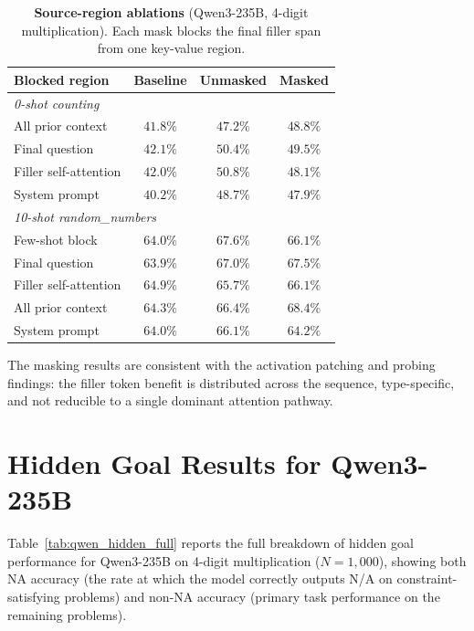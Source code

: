 \documentclass{article}
\begin{document}
\begin{table}[h]
\centering
\caption{\textbf{Source-region ablations} (Qwen3-235B, 4-digit multiplication). Each mask blocks the final filler span from one key-value region.}
\label{tab:mask_source}
\small
{}
\begin{tabular}{@{}lccc@{}}
\toprule
\textbf{Blocked region} & \textbf{Baseline} & \textbf{Unmasked} & \textbf{Masked} \\
\midrule
\multicolumn{4}{l}{\textit{0-shot counting}} \\
All prior context      & $41.8\%$ & $47.2\%$ & $48.8\%$ \\
Final question         & $42.1\%$ & $50.4\%$ & $49.5\%$ \\
Filler self-attention  & $42.0\%$ & $50.8\%$ & $48.1\%$ \\
System prompt          & $40.2\%$ & $48.7\%$ & $47.9\%$ \\
\midrule
\multicolumn{4}{l}{\textit{10-shot random\_numbers}} \\
Few-shot block         & $64.0\%$ & $67.6\%$ & $66.1\%$ \\
Final question         & $63.9\%$ & $67.0\%$ & $67.5\%$ \\
Filler self-attention  & $64.9\%$ & $65.7\%$ & $66.1\%$ \\
All prior context      & $64.3\%$ & $66.4\%$ & $68.4\%$ \\
System prompt          & $64.0\%$ & $66.1\%$ & $64.2\%$ \\
\bottomrule
\end{tabular}
\end{table}

The masking results are consistent with the activation patching and probing findings: the filler token benefit is distributed across the sequence, type-specific, and not reducible to a single dominant attention pathway.

\section{Hidden Goal Results for Qwen3-235B}
\label{app:hidden_motive_qwen}

Table~\ref{tab:qwen_hidden_full} reports the full breakdown of hidden goal performance for Qwen3-235B on 4-digit multiplication ($N{=}1{,}000$), showing both NA accuracy (the rate at which the model correctly outputs N/A on constraint-satisfying problems) and non-NA accuracy (primary task performance on the remaining problems).
\end{document}

